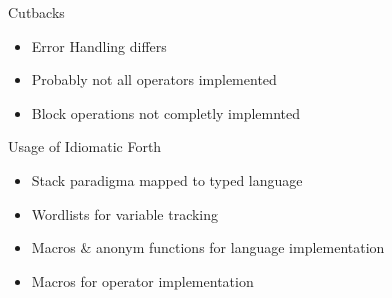 \documentclass{beamer}
\begin{document}
\begin{frame}
    Cutbacks
    \begin{itemize}
    \item Error Handling differs
    \item Probably not all operators implemented
    \item Block operations not completly implemnted
    \end{itemize}
\end{frame}


\begin{frame}
    Usage of Idiomatic Forth
    \begin{itemize}
    \item Stack paradigma mapped to typed language
    \item Wordlists for variable tracking 
    \item Macros \& anonym functions for language implementation
    \item Macros for operator implementation
    \end{itemize}
\end{frame}
\end{document}
